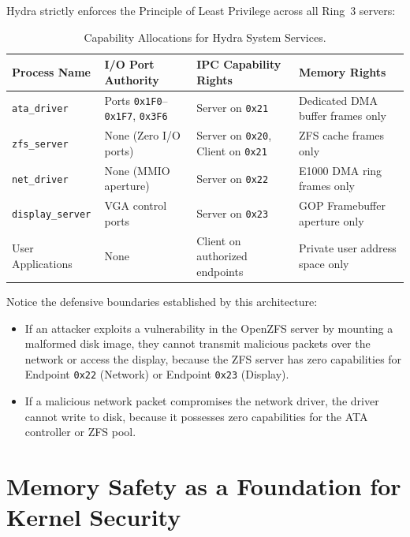 Hydra strictly enforces the Principle of Least Privilege across all Ring~3 servers:

\begin{table}[htbp]
\centering
\small
\begin{tabular}{llll}
\hline
\textbf{Process Name} & \textbf{I/O Port Authority} & \textbf{IPC Capability Rights} & \textbf{Memory Rights} \\
\hline
\texttt{ata\_driver} & Ports \texttt{0x1F0}--\texttt{0x1F7}, \texttt{0x3F6} & Server on \texttt{0x21} & Dedicated DMA buffer frames only \\
\texttt{zfs\_server} & None (Zero I/O ports) & Server on \texttt{0x20}, Client on \texttt{0x21} & ZFS cache frames only \\
\texttt{net\_driver} & None (MMIO aperture) & Server on \texttt{0x22} & E1000 DMA ring frames only \\
\texttt{display\_server} & VGA control ports & Server on \texttt{0x23} & GOP Framebuffer aperture only \\
User Applications & None & Client on authorized endpoints & Private user address space only \\
\hline
\end{tabular}
\caption{Capability Allocations for Hydra System Services.}
\label{tab:cap_alloc}
\end{table}

Notice the defensive boundaries established by this architecture:
\begin{itemize}
    \item If an attacker exploits a vulnerability in the OpenZFS server by mounting a malformed disk image, they cannot transmit malicious packets over the network or access the display, because the ZFS server has zero capabilities for Endpoint \texttt{0x22} (Network) or Endpoint \texttt{0x23} (Display).
    \item If a malicious network packet compromises the network driver, the driver cannot write to disk, because it possesses zero capabilities for the ATA controller or ZFS pool.
\end{itemize}

\section{Memory Safety as a Foundation for Kernel Security}
\label{sec:rust_security}


